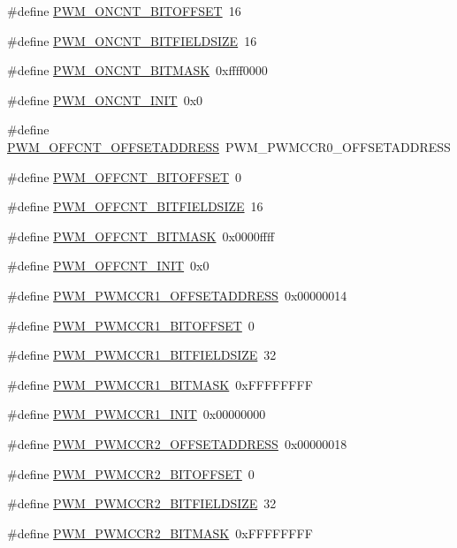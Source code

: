 \begin{DoxyCompactItemize}
\item 
\#define \hyperlink{a00565_a1e31aee8b02e1ec10576c7baf924a301}{PWM\_\-ONCNT\_\-BITOFFSET}~16
\item 
\#define \hyperlink{a00565_ac2e2ae1a3f8bed8129a1f3b1c84650b0}{PWM\_\-ONCNT\_\-BITFIELDSIZE}~16
\item 
\#define \hyperlink{a00565_abf8c208ee2db737284329994da3cb497}{PWM\_\-ONCNT\_\-BITMASK}~0xffff0000
\item 
\#define \hyperlink{a00565_a93caaeaab33b499e005ec9df26cafd86}{PWM\_\-ONCNT\_\-INIT}~0x0
\item 
\#define \hyperlink{a00565_a2cf73b7444de137029b012f9e299083b}{PWM\_\-OFFCNT\_\-OFFSETADDRESS}~PWM\_\-PWMCCR0\_\-OFFSETADDRESS
\item 
\#define \hyperlink{a00565_a8f9fdf1c7df6872936cc569b9bcaa5c6}{PWM\_\-OFFCNT\_\-BITOFFSET}~0
\item 
\#define \hyperlink{a00565_a74e5ecaa49850efdabf02db2adf9fba8}{PWM\_\-OFFCNT\_\-BITFIELDSIZE}~16
\item 
\#define \hyperlink{a00565_a3431544ba0e652cbec2e5ab87ce6ffb6}{PWM\_\-OFFCNT\_\-BITMASK}~0x0000ffff
\item 
\#define \hyperlink{a00565_ae3b6c31203f7d1effb77cf64328f3419}{PWM\_\-OFFCNT\_\-INIT}~0x0
\item 
\#define \hyperlink{a00565_a86f5110d45040c237a33483a0362c951}{PWM\_\-PWMCCR1\_\-OFFSETADDRESS}~0x00000014
\item 
\#define \hyperlink{a00565_abfe1fa91401442ffba6dad205931bf9c}{PWM\_\-PWMCCR1\_\-BITOFFSET}~0
\item 
\#define \hyperlink{a00565_af940af59835c3aaade205c23e1f0305c}{PWM\_\-PWMCCR1\_\-BITFIELDSIZE}~32
\item 
\#define \hyperlink{a00565_a007d09bc215a10dc77951153d07070df}{PWM\_\-PWMCCR1\_\-BITMASK}~0xFFFFFFFF
\item 
\#define \hyperlink{a00565_acf04b09e34761a2e587b0e4f777f87bd}{PWM\_\-PWMCCR1\_\-INIT}~0x00000000
\item 
\#define \hyperlink{a00565_ad5621eac4c6082f349e0870570ced3b8}{PWM\_\-PWMCCR2\_\-OFFSETADDRESS}~0x00000018
\item 
\#define \hyperlink{a00565_a04dc50da34fd6cd18f8e4f5ad9be1eaf}{PWM\_\-PWMCCR2\_\-BITOFFSET}~0
\item 
\#define \hyperlink{a00565_a9452ecb41ecd79d01af0caffd9119bca}{PWM\_\-PWMCCR2\_\-BITFIELDSIZE}~32
\item 
\#define \hyperlink{a00565_a9c092dac6dff536fa655daa89f6a1143}{PWM\_\-PWMCCR2\_\-BITMASK}~0xFFFFFFFF

\end{DoxyCompactItemize}
